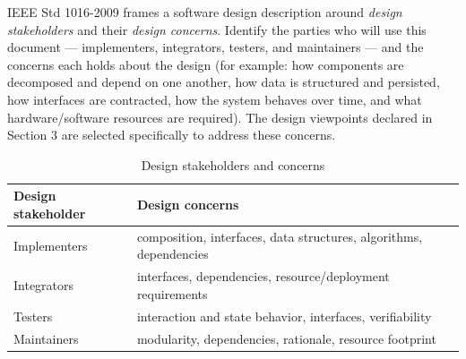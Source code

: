 IEEE Std 1016-2009 \cite{IEEE1016} frames a software design description around \textit{design stakeholders} and their \textit{design concerns}. Identify the parties who will use this document --- implementers, integrators, testers, and maintainers --- and the concerns each holds about the design (for example: how components are decomposed and depend on one another, how data is structured and persisted, how interfaces are contracted, how the system behaves over time, and what hardware/software resources are required). The design viewpoints declared in Section 3 are selected specifically to address these concerns.

\begin{table}[H]
\caption{Design stakeholders and concerns}
\begin{center}
    \begin{tabular}{ | p{4cm} | p{9cm} |}
    \hline
    \textbf{Design stakeholder} & \textbf{Design concerns} \\ \hline
    Implementers & composition, interfaces, data structures, algorithms, dependencies \\ \hline
    Integrators & interfaces, dependencies, resource/deployment requirements \\ \hline
    Testers & interaction and state behavior, interfaces, verifiability \\ \hline
    Maintainers & modularity, dependencies, rationale, resource footprint \\ \hline
    \end{tabular}
\end{center}
\end{table}
